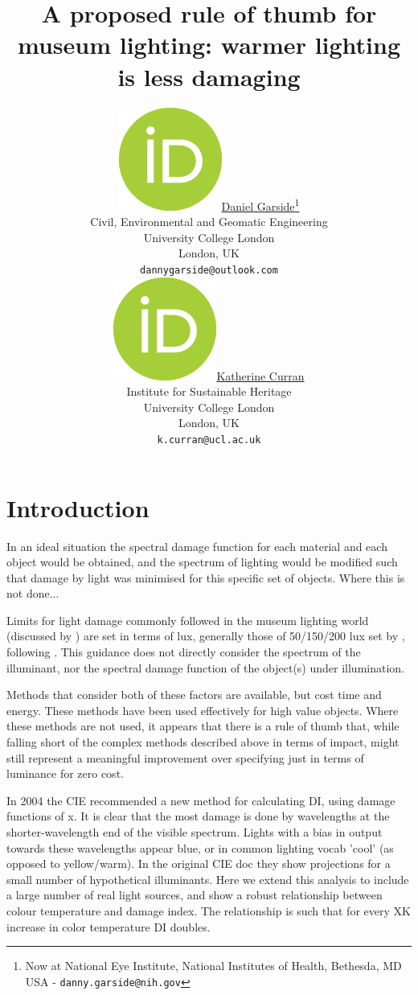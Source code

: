\documentclass{article}
\title{A proposed rule of thumb for museum lighting: warmer lighting is less damaging}
\author{ \href{https://orcid.org/0000-0002-4579-003X}{\includegraphics[scale=0.06]{orcid.png}\hspace{1mm}Daniel Garside}\thanks{Now at National Eye Institute, National Institutes of Health, Bethesda, MD USA - \texttt{danny.garside@nih.gov}}\\
	Civil, Environmental and Geomatic Engineering\\
	University College London\\
	London, UK \\
	\texttt{dannygarside@outlook.com} \\
	\And
	\href{https://orcid.org/0000-0001-7169-3359}{\includegraphics[scale=0.06]{orcid.png}\hspace{1mm}Katherine Curran} \\
	Institute for Sustainable Heritage\\
	University College London\\
	London, UK \\
	\texttt{k.curran@ucl.ac.uk} \\
}
\begin{document}
\maketitle

\begin{abstract}
	\lipsum[1]
\end{abstract}




\section{Introduction}
In an ideal situation the spectral damage function for each material and each object would be obtained, and the spectrum of lighting would be modified such that damage by light was minimised for this specific set of objects. Where this is not done...

Limits for light damage commonly followed in the museum lighting world (discussed by \cite{garside_how_2017}) are set in terms of lux, generally those of 50/150/200 lux set by \cite{thomson_museum_1978,thomson_museum_1986}, following \cite{loe_preferred_1982}. This guidance does not directly consider the spectrum of the illuminant, nor the spectral damage function of the object(s) under illumination. 

Methods that consider both of these factors are available, but cost time and energy. These methods have been used effectively for high value objects. Where these methods are not used, it appears that there is a rule of thumb that, while falling short of the complex methods described above in terms of impact, might still represent a meaningful improvement over specifying just in terms of luminance for zero cost.

In 2004 the CIE recommended a new method for calculating DI, using damage functions of x. It is clear that the most damage is done by wavelengths at the shorter-wavelength end of the visible spectrum. Lights with a bias in output towards these wavelengths appear blue, or in common lighting vocab 'cool' (as opposed to yellow/warm). In the original CIE doc they show projections for a small number of hypothetical illuminants. Here we extend this analysis to include a large number of real light sources, and show a robust relationship between colour temperature and damage index. The relationship is such that for every XK increase in color temperature DI doubles.
\end{document}
